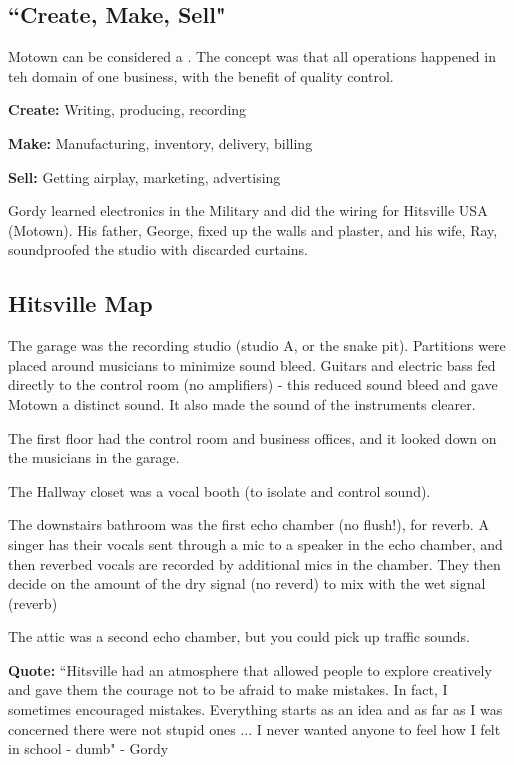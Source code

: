 \documentclass[12pt, a4paper, twoside, openright, titlepage]{book}
\begin{document}
\subsection{``Create, Make, Sell"}

Motown can be considered a . The concept was that all operations happened in teh domain of one business, with the benefit of quality control.

\textbf{Create:} Writing, producing, recording


\textbf{Make:} Manufacturing, inventory, delivery, billing


\textbf{Sell:} Getting airplay, marketing, advertising


\begin{note}{}{}
    Gordy learned electronics in the Military and did the wiring for Hitsville USA (Motown). His father, George, fixed up the walls and plaster, and his wife, Ray, soundproofed the studio with discarded curtains.
\end{note}

\subsection{Hitsville Map}


The garage was the recording studio (studio A, or the snake pit). Partitions were placed around musicians to minimize sound bleed. Guitars and electric bass fed directly to the control room (no amplifiers) - this reduced sound bleed and gave Motown a distinct sound. It also made the sound of the instruments clearer.


The first floor had the control room and business offices, and it looked down on the musicians in the garage.


The Hallway closet was a vocal booth (to isolate and control sound).

The downstairs bathroom was the first echo chamber (no flush!), for reverb. A singer has their vocals sent through a mic to a speaker in the echo chamber, and then reverbed vocals are recorded by additional mics in the chamber. They then decide on the amount of the dry signal (no reverd) to mix with the wet signal (reverb)


The attic was a second echo chamber, but you could pick up traffic sounds.


\textbf{Quote:} ``Hitsville had an atmosphere that allowed people to explore creatively and gave them the courage not to be afraid to make mistakes. In fact, I sometimes encouraged mistakes. Everything starts as an idea and as far as I was concerned there were not stupid ones ... I never wanted anyone to feel how I felt in school - dumb" - Gordy
\end{document}
